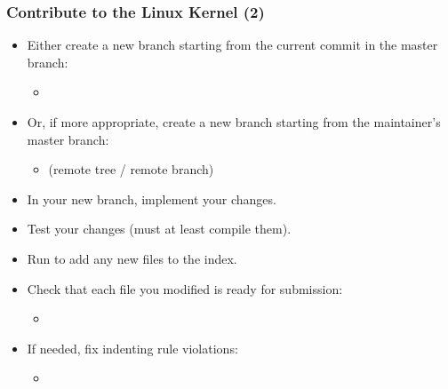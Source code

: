 \begin{frame}
  \frametitle{Contribute to the Linux Kernel (2)}
  \begin{itemize}
  \item Either create a new branch starting from the current commit in
    the master branch:
    \begin{itemize}
    \item {}
    \end{itemize}
  \item Or, if more appropriate, create a new branch starting from the
    maintainer's master branch:
    \begin{itemize}
    \item {} (remote
      tree / remote branch)
    \end{itemize}
  \item In your new branch, implement your changes.
  \item Test your changes (must at least compile them).
  \item Run  to add any new files to the index.
  \item Check that each file you modified is ready for submission:
    \begin{itemize}
    \item {}
    \end{itemize}
  \item If needed, fix indenting rule violations:
    \begin{itemize}
    \item {}
    \end{itemize}
  \end{itemize}
\end{frame}

